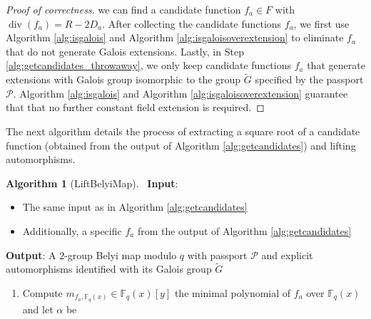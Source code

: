 \documentclass{dcthesis}
\newcommand{\mm}[1]{{\color{blue} \sf MM: [#1]}}
\newcommand{\wt}[1]{\widetilde{#1}}
\newcommand{\FF}{\mathbb{F}}
\DeclareMathOperator{\ddiv}{div}
\numberwithin{equation}{section}
\theoremstyle{definition}
\newtheorem{alg}[equation]{Algorithm}
\theoremstyle{remark}
\begin{document}
{{{\begin{proof}[Proof of correctness]
      we can find a candidate function
      $f_a\in F$ with $\ddiv(f_a) = R-2D_a$.
      After collecting the candidate functions
      $f_a$,
      we first use
      Algorithm
      \ref{alg:isgalois}
      and
      Algorithm
      \ref{alg:isgaloisoverextension}
      to eliminate $f_a$ that
      do not generate Galois extensions.
      Lastly,
      in Step
      \ref{alg:getcandidates_throwaway},
      we only keep candidate functions
      $f_a$ that generate extensions
      with Galois group isomorphic
      to the group
      $\wt{G}$ specified by the passport
      $\mathcal{P}$.
      Algorithm
      \ref{alg:isgalois}
      and Algorithm
      \ref{alg:isgaloisoverextension}
      guarantee that that no
      further constant field extension is
      required.
    \end{proof}
    The next algorithm details
    the process of extracting a square root
    of a candidate function
    (obtained from the output of
    Algorithm \ref{alg:getcandidates})
    and lifting automorphisms.
    \begin{alg}[LiftBelyiMap]
      \label{alg:liftbelyimap}
      \,
      \newline
      \textbf{Input}:
      \begin{itemize}
        \item
          The same input as in
          Algorithm
          \ref{alg:getcandidates}
        \item
          Additionally,
          a specific
          $f_a$ from the output of
          Algorithm
          \ref{alg:getcandidates}
      \end{itemize}
      \textbf{Output}:
      A $2$-group Belyi map modulo $q$
      with passport $\mathcal{P}$
      and explicit automorphisms
      identified with its Galois group
      $\wt{G}$
      \begin{enumerate}
        \item
          Compute $m_{f_a,\FF_q(x)}\in\FF_q(x)[y]$
          the minimal polynomial of $f_a$
          over $\FF_q(x)$
          and let $\alpha$ be

\end{enumerate}
\end{alg}}}}
\end{document}
